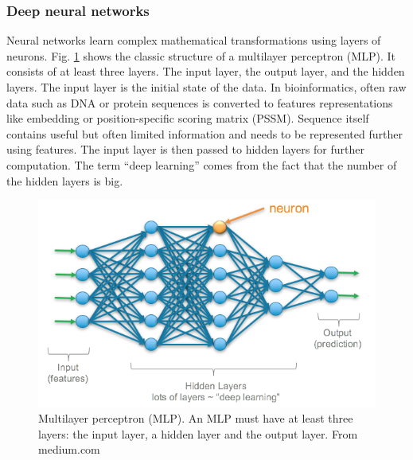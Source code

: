\subsubsection{Deep neural networks}
Neural networks learn complex mathematical transformations using layers of neurons. Fig. \ref{fig_mlp} shows the classic structure of a multilayer perceptron (MLP). It consists of at least three layers. The input layer, the output layer, and the hidden layers. The input layer is the initial state of the data. In bioinformatics, often raw data such as DNA or protein sequences is converted to features representations like embedding or position-specific scoring matrix (PSSM). Sequence itself contains useful but often limited information and needs to be represented further using features. The input layer is then passed to hidden layers for further computation. The term “deep learning” comes from the fact that the number of the hidden layers is big.
\begin{figure}[h!]
\begin{center}
\includegraphics[width = 13cm]{img/multiplayer_perceptron.png}
\caption{Multilayer perceptron (MLP). An MLP must have at least three layers: the input layer, a hidden layer and the output layer. From medium.com \label{fig_mlp}}
\end{center}
\end{figure}

